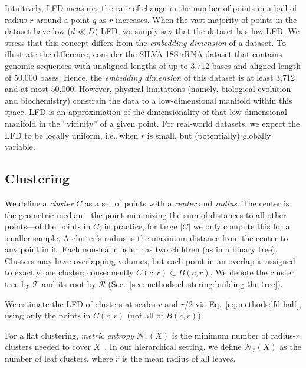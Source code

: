 Intuitively, LFD measures the rate of change in the number of points in a ball of radius $r$ around a point $q$ as $r$ increases.
When the vast majority of points in the dataset have low ($d \ll D$) LFD, we simply say that the dataset has low LFD.
We stress that this concept differs from the \textit{embedding dimension} of a dataset.
To illustrate the difference, consider the SILVA 18S rRNA dataset that contains genomic sequences with unaligned lengths of up to 3,712 bases and aligned length of 50,000 bases.
Hence, the \textit{embedding dimension} of this dataset is at least 3,712 and at most 50,000.
However, physical limitations (namely, biological evolution and biochemistry) constrain the data to a low-dimensional manifold within this space.
LFD is an approximation of the dimensionality of that low-dimensional manifold in the ``vicinity'' of a given point.
For real-world datasets, we expect the LFD to be locally uniform, i.e.,\,when $r$ is small, but (potentially) globally variable.


\subsection{Clustering}
\label{sec:methods:clustering}

We define a \emph{cluster} $C$ as a set of points with a \emph{center} and \emph{radius}.
The center is the geometric median—the point minimizing the sum of distances to all other points—of the points in $C$;
in practice, for large $|C|$ we only compute this for a smaller sample.
A cluster's radius is the maximum distance from the center to any point in it.
Each non-leaf cluster has two children (as in a binary tree).
Clusters may have overlapping volumes, but each point in an overlap is assigned to exactly one cluster;
consequently $C(c,r)\subset B(c,r)$.
We denote the cluster tree by $\mathcal{T}$ and its root by $\mathcal{R}$ (Sec.~\ref{sec:methods:clustering:building-the-tree}).

We estimate the LFD of clusters at scales $r$ and $r/2$ via Eq.~\ref{eq:methods:lfd-half}, using only the points in $C(c,r)$ (not all of $B(c,r)$).

For a flat clustering, \emph{metric entropy} $\mathcal{N}_r(X)$ is the minimum number of radius-$r$ clusters needed to cover $X$~\cite{yu2015entropy}.
In our hierarchical setting, we define $\mathcal{N}_{\hat r}(X)$ as the number of leaf clusters, where $\hat r$ is the mean radius of all leaves.


